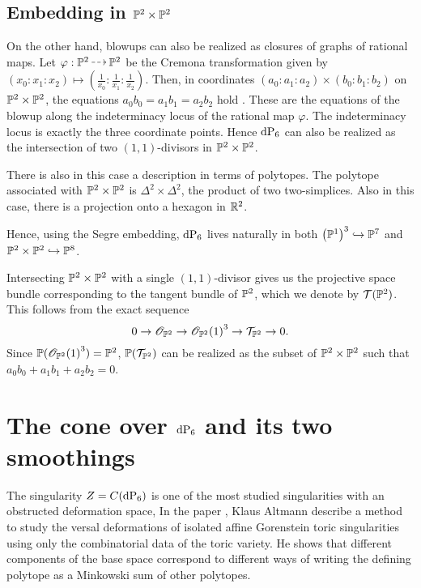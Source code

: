 \subsection{Embedding in $\P^2 \times \P^2$}

On the other hand, blowups can also be realized as closures of graphs of rational maps. Let $\varphi: \P^2 \rmap \P^2$ be the Cremona transformation given by $(x_0:x_1:x_2) \mapsto \left( \frac 1{x_0}: \frac 1{x_1}:\frac 1{x_2} \right)$. Then, in coordinates $(a_0:a_1:a_2) \times(b_0:b_1:b_2)$ on $\P^2 \times \P^2$, the equations $a_0b_0=a_1b_1=a_2b_2$ hold \label{eq:dp6_inp2p2}. These are the equations of the blowup along the indeterminacy locus of the rational map $\varphi$. The indeterminacy locus is exactly the three coordinate points. Hence $\dP6$ can also be realized as the intersection of two $(1,1)$-divisors in $\P^2 \times \P^2$. 

There is also in this case a description in terms of polytopes. The polytope associated with $\P^2 \times \P^2$ is $\Delta^2 \times \Delta^2$, the product of two two-simplices. Also in this case, there is a projection onto a hexagon in $\R^2$. 

Hence, using the Segre embedding, $\dP6$ lives naturally in both ${\left( \P^1 \right)}^3 \hookrightarrow \P^7$ and $\P^2 \times \P^2 \hookrightarrow \P^8$. 

\begin{remark}
Intersecting $\P^2 \times \P^2$ with a single $(1,1)$-divisor gives us the projective space bundle corresponding to the tangent bundle of $\P^2$, which we denote by $\mathcal T(\P^2)$. This follows from the exact sequence
\[
0 \to \OO_{\P^2} \to {\OO_{\P^2}(1)}^3 \to \mathcal T_{\P^2} \to 0.
\]
Since $\P({\OO_{\P^2}(1)}^3)=\P^2$,  $\P(\mathcal T_{\P^2})$ can be realized as the subset of $\P^2 \times \P^2$ such that $a_0b_0+a_1b_1+a_2b_2=0$.
\end{remark}


\section{The cone over \texorpdfstring{$\dP6$}{dP6} and its two smoothings}

The singularity $Z=C(\dP6)$ is one of the most studied singularities with an obstructed deformation space, In the paper \cite{altmann_versaldeformation}, Klaus Altmann describe a method to study the versal deformations of isolated affine Gorenstein toric singularities using only the combinatorial data of the toric variety. He shows that different components of the base space correspond to different ways of writing the defining polytope as a Minkowski sum of other polytopes.

